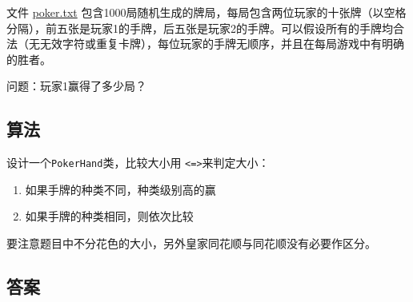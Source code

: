 \begin{tcolorbox}[breakable]
    文件 \href{https://projecteuler.net/resources/documents/0054_poker.txt}{poker.txt} 包含1000局随机生成的牌局，每局包含两位玩家的十张牌（以空格分隔），前五张是玩家1的手牌，后五张是玩家2的手牌。可以假设所有的手牌均合法（无无效字符或重复卡牌），每位玩家的手牌无顺序，并且在每局游戏中有明确的胜者。

	问题：玩家1赢得了多少局？

\end{tcolorbox}

\subsection{算法}
设计一个\texttt{PokerHand}类，比较大小用 \texttt{<=>}来判定大小：
\begin{enumerate}
    \item 如果手牌的种类不同，种类级别高的赢
    \item 如果手牌的种类相同，则依次比较
\end{enumerate}
要注意题目中不分花色的大小，另外皇家同花顺与同花顺没有必要作区分。

\subsection{答案}
